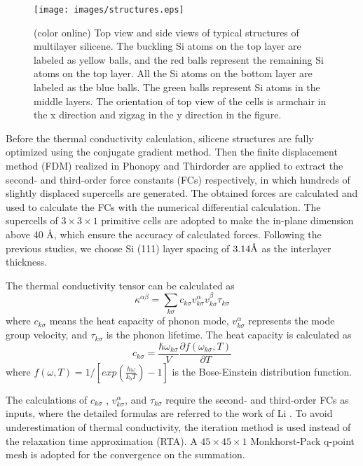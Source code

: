 \documentclass[aps,prb,twocolumn,showpacs,amsmath,amssymb]{revtex4-1}
\newcommand{\angstrom}{\mbox{\normalfont\AA}}
\begin{document}
\begin{figure}[b]
  \texttt{[image: images/structures.eps]}
  \caption{\label{fig:structures}  (color online)  Top view and side views of typical structures of multilayer silicene. The buckling Si atoms on the top layer are labeled as yellow balls, and the red balls represent the remaining Si atoms on the top layer. All the Si atoms on the bottom layer are labeled as the blue balls. The green balls represent Si atoms in the middle layers. The orientation of top view of the cells is armchair in the x direction and zigzag in the y direction in the figure.}
\end{figure}

Before the thermal conductivity calculation, silicene structures are fully optimized using the conjugate gradient method.  Then the finite displacement method (FDM) realized in Phonopy\cite{Togo2008} and Thirdorder \cite{Li2014} are applied to extract the second- and third-order force constants (FCs) respectively,  in which hundreds of  slightly displaced supercells are generated. The obtained forces are calculated and used to calculate the FCs with the numerical differential calculation. The supercells of $3 \times 3 \times 1$ primitive cells are adopted to make the in-plane dimension above 40 \angstrom, which ensure the accuracy of calculated forces. Following the previous studies\cite{Pei2013,Fu2014}, we choose Si (111) layer spacing of $3.14 \angstrom$ as the interlayer thickness.

The thermal conductivity tensor can be calculated as
\begin{equation}
  \kappa^{\alpha\beta} = \sum_{k \sigma}{c_{k \sigma}v^{\alpha}_{k \sigma}v^{\beta}_{k \sigma}\tau_{k \sigma}} \label{eq:kappasum}
\end{equation}
where $c_{k \sigma}$ means the heat capacity of phonon mode,  $v_{k \sigma}^{\alpha}$ represents the mode group velocity, and $\tau_{k \sigma}$ is the phonon lifetime. The heat capacity is calculated as
\begin{equation}
  c_{k \sigma}=\frac{\hbar \omega_{k \sigma} }{V} \frac{\partial f(\omega_{k \sigma},T)}{\partial T} \label{eq:cv}
\end{equation}
where $ f(\omega,T)=1/[exp(\frac{\hbar \omega}{k_b T})-1]$ is the Bose-Einstein distribution function.

The calculations of $c_{k\sigma}$ , $v_{k \sigma}^{\alpha}$, and $\tau_{k\sigma}$ require the second- and third-order FCs as inputs, where the detailed formulas are referred to the work of  Li \cite{Li2014}. To avoid underestimation of thermal conductivity, the iteration method is used instead of the relaxation time approximation (RTA). A $45\times 45 \times 1$ Monkhorst-Pack q-point mesh is adopted for the convergence on the summation.
\end{document}
